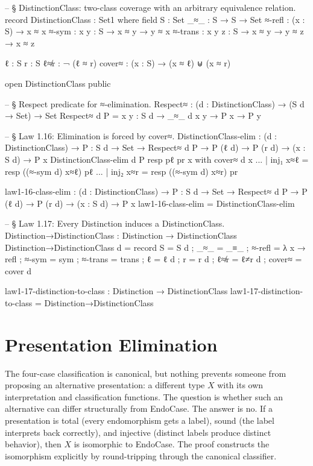 \documentclass[11pt,a4paper]{book}
\def\texttt#1{#1}%
\begin{document}
\begin{code}
-- § DistinctionClass: two-class coverage with an arbitrary equivalence relation.
record DistinctionClass : Set1 where
  field
    S      : Set
    _≈_    : S → S → Set
    ≈-refl : (x : S) → x ≈ x
    ≈-sym  : {x y : S} → x ≈ y → y ≈ x
    ≈-trans : {x y z : S} → x ≈ y → y ≈ z → x ≈ z

    ℓ      : S
    r      : S
    ℓ≉r    : ¬ (ℓ ≈ r)
    cover≈ : (x : S) → (x ≈ ℓ) ⊎ (x ≈ r)

open DistinctionClass public

-- § Respect predicate for ≈-elimination.
Respect≈ : (d : DistinctionClass) → (S d → Set) → Set
Respect≈ d P = {x y : S d} → _≈_ d x y → P x → P y

-- § Law 1.16: Elimination is forced by cover≈.
DistinctionClass-elim :
  (d : DistinctionClass) →
  {P : S d → Set} →
  Respect≈ d P →
  P (ℓ d) →
  P (r d) →
  (x : S d) →
  P x
DistinctionClass-elim d {P} resp pℓ pr x with cover≈ d x
... | inj₁ x≈ℓ = resp ((≈-sym d) x≈ℓ) pℓ
... | inj₂ x≈r = resp ((≈-sym d) x≈r) pr

law1-16-class-elim :
  (d : DistinctionClass) →
  {P : S d → Set} →
  Respect≈ d P →
  P (ℓ d) →
  P (r d) →
  (x : S d) →
  P x
law1-16-class-elim = DistinctionClass-elim

-- § Law 1.17: Every Distinction induces a DistinctionClass.
Distinction→DistinctionClass : Distinction → DistinctionClass
Distinction→DistinctionClass d = record
  { S       = S d
  ; _≈_     = _≡_
  ; ≈-refl  = λ x → refl
  ; ≈-sym   = sym
  ; ≈-trans = trans
  ; ℓ       = ℓ d
  ; r       = r d
  ; ℓ≉r     = ℓ≠r d
  ; cover≈  = cover d
  }

law1-17-distinction-to-class : Distinction → DistinctionClass
law1-17-distinction-to-class = Distinction→DistinctionClass
\end{code}

\section{Presentation Elimination}

The four-case classification is canonical, but nothing prevents someone from proposing an alternative presentation: a different type $X$ with its own interpretation and classification functions. The question is whether such an alternative can differ structurally from \texttt{EndoCase}. The answer is no. If a presentation is total (every endomorphism gets a label), sound (the label interprets back correctly), and injective (distinct labels produce distinct behavior), then $X$ is isomorphic to \texttt{EndoCase}. The proof constructs the isomorphism explicitly by round-tripping through the canonical classifier.
\end{document}
